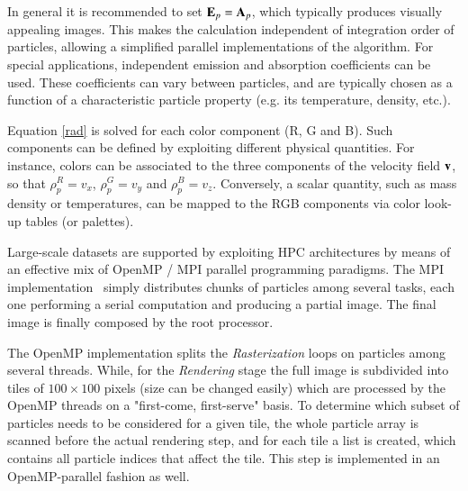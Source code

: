 \documentclass[1p]{elsarticle}
\begin{document}
\begin{itemize}

In general it is recommended to set ${\bf E}_p = {\bf A}_p$,
which typically produces visually appealing images.
This makes the calculation independent of integration order of particles, allowing a simplified parallel implementations of the algorithm.
For special applications,
independent emission and absorption coefficients can be used. These coefficients
can vary between particles, and are typically chosen as a function of a characteristic
particle property (e.g. its temperature, density, etc.).


Equation \eqref{rad} is solved for each color component (R, G and B). Such components can be defined by exploiting different physical quantities. For instance, colors  can be associated to the three components of the velocity field $\bf v$, so that 
$\rho_p^{R}=v_x$, $\rho_p^{G}=v_y$ and $\rho_p^{B}=v_z$. Conversely, a scalar quantity, such as mass density or temperatures, can be mapped to the RGB components via color look-up tables (or palettes). 
\end{itemize}
Large-scale datasets are supported by exploiting HPC architectures by means of an effective mix of OpenMP / MPI parallel programming paradigms. The MPI implementation~\cite{jin:high-performance}  simply distributes chunks of particles among several tasks, each one performing a serial computation and producing a partial image. The final image is finally composed by the root processor.  
 
The OpenMP implementation splits the {\it Rasterization} loops on particles among several threads. While, for the {\it Rendering} stage the full image is subdivided into tiles of $100 \times 100$ pixels (size can be changed easily) which are processed by the OpenMP threads on a "first-come, first-serve" basis. To determine which subset of particles needs to be considered for a given tile, the whole particle array is scanned before the actual rendering step, and for each tile a list is created, which contains all particle indices that affect the tile. This step is implemented in an OpenMP-parallel fashion as well.
\end{document}
